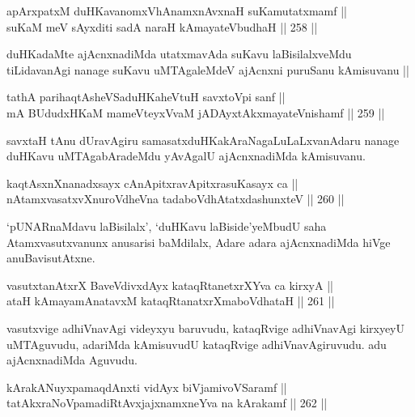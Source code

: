 \begin{shl}
apArxpatxM duHKavanomxVhAnamxnAvxnaH suKamutatxmamf || \\
suKaM meV sAyxditi sadA naraH kAmayateV\s budhaH \hfill || 258 ||  
\end{shl}

\begin{artha}
duHKadaMte ajAcnxnadiMda utatxmavAda suKavu laBisilalxveMdu
tiLidavanAgi nanage suKavu uMTAgaleMdeV ajAcnxni puruSanu kAmisuvanu ||
\end{artha}

\begin{shl}
tathA parihaqtAsheVSaduHKaheVtuH savxtoV\s pi sanf || \\
mA BUdudxHKaM mameVteyxVvaM jADAyxtAkxmayateV\s nishamf \hfill || 259 || 
\end{shl}

\begin{artha}
savxtaH tAnu dUravAgiru samasatxduHKakAraNagaLuLaLxvanAdaru nanage
duHKavu uMTAgabAradeMdu yAvAgalU ajAcnxnadiMda kAmisuvanu.
\end{artha}

\begin{shl}
kaqtAsxnXnanadxsayx cAnApitxravApitxrasuKasayx ca || \\
nA\s \s tamxvasatxvXnuroVdheVna tadaboVdhAtatxdashunxteV \hfill || 260 ||  
\end{shl}

\begin{artha}
`pUNARnaMdavu laBisilalx', `duHKavu laBiside'yeMbudU saha
Atamxvasutxvanunx anusarisi baMdilalx, Adare adara ajAcnxnadiMda hiVge anuBavisutAtxne.
\end{artha}

\begin{shl}
vasutxtanAtxrX BaveVdivxdAyx kataqRtanetxrXYva ca kirxyA ||  \\
ataH kAmayamAnatavxM kataqRtanatxrXmaboVdhataH \hfill || 261 ||  
\end{shl}

\begin{artha}
vasutxvige adhiVnavAgi videyxyu baruvudu, kataqRvige adhiVnavAgi
kirxyeyU uMTAguvudu, adariMda kAmisuvudU kataqRvige adhiVnavAgiruvudu.
adu ajAcnxnadiMda Aguvudu.
\end{artha}

\begin{shl}
kArakANuyxpamaqdAnxti vidAyx biVjamivoVSaramf || \\
tatAkxraNoVpamadiRtAvxjajxnamxneYva na kArakamf \hfill || 262 ||  
\end{shl}

